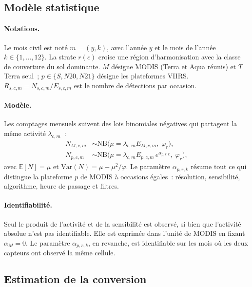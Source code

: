 \documentclass[11pt,a4paper]{article}
\begin{document}
\subsection{Modèle statistique}

\paragraph{Notations.} Le mois civil est noté $m = (y,k)$, avec l'année $y$ et le mois de l'année $k\in\{1,\dots,12\}$. La strate $r(c)$ croise une région d'harmonisation avec la classe de couverture du sol dominante. $M$ désigne MODIS (Terra et Aqua réunis) et $T$ Terra seul~; $p \in \{S, N20, N21\}$ désigne les plateformes VIIRS. $R_{s,c,m} = N_{s,c,m}/E_{s,c,m}$ est le nombre de détections par occasion.

\paragraph{Modèle.} Les comptages mensuels suivent des lois binomiales négatives qui partagent la même activité $\lambda_{c,m}$~:
\begin{align}
  N_{M,c,m} &\sim \mathrm{NB}\big(\mu = \lambda_{c,m} E_{M,c,m},\; \varphi_r\big), \label{eq:nbM}\\
  N_{p,c,m} &\sim \mathrm{NB}\big(\mu = \lambda_{c,m} E_{p,c,m}\, e^{\alpha_{p,r,k}},\; \varphi_r\big), \label{eq:nbP}
\end{align}
avec $\mathbb{E}[N]=\mu$ et $\mathrm{Var}(N) = \mu + \mu^2/\varphi$. Le paramètre $\alpha_{p,r,k}$ résume tout ce qui distingue la plateforme $p$ de MODIS à occasions égales~: résolution, sensibilité, algorithme, heure de passage et filtres.

\paragraph{Identifiabilité.} Seul le produit de l'activité et de la sensibilité est observé, si bien que l'activité absolue n'est pas identifiable. Elle est exprimée dans l'unité de MODIS en fixant $\alpha_M = 0$. Le paramètre $\alpha_{p,r,k}$, en revanche, est identifiable sur les mois où les deux capteurs ont observé la même cellule.

\subsection{Estimation de la conversion}
\end{document}
